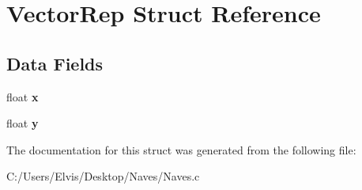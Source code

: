 \hypertarget{struct_vector_rep}{}\section{Vector\+Rep Struct Reference}
\label{struct_vector_rep}
\subsection*{Data Fields}
\begin{DoxyCompactItemize}
\item 
float {\bfseries x}\hypertarget{struct_vector_rep_ad0da36b2558901e21e7a30f6c227a45e}{}\label{struct_vector_rep_ad0da36b2558901e21e7a30f6c227a45e}

\item 
float {\bfseries y}\hypertarget{struct_vector_rep_aa4f0d3eebc3c443f9be81bf48561a217}{}\label{struct_vector_rep_aa4f0d3eebc3c443f9be81bf48561a217}

\end{DoxyCompactItemize}


The documentation for this struct was generated from the following file\+:\begin{DoxyCompactItemize}
\item 
C\+:/\+Users/\+Elvis/\+Desktop/\+Naves/Naves.\+c\end{DoxyCompactItemize}
